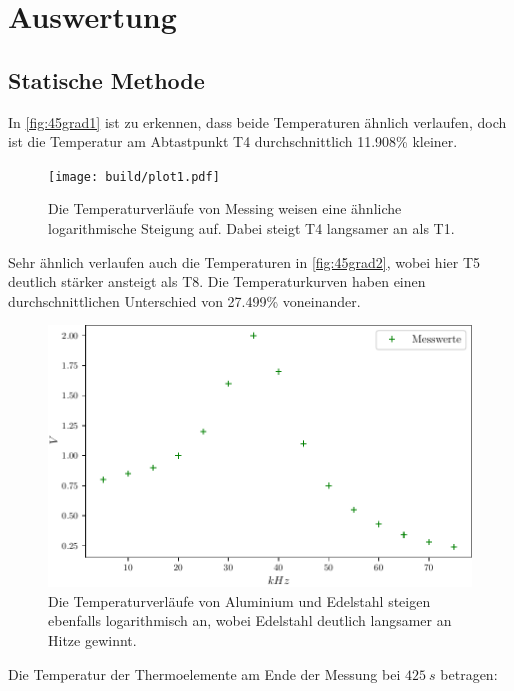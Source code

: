 \section{Auswertung}
\label{sec:Auswertung}

\subsection{Statische Methode}

In \autoref{fig:45grad1} ist zu erkennen, dass beide Temperaturen ähnlich verlaufen, doch ist die Temperatur am Abtastpunkt T4 durchschnittlich 11.908\% kleiner.

\begin{figure}
    \centering
    \texttt{[image: build/plot1.pdf]}
    \caption{Die Temperaturverläufe von Messing  weisen eine ähnliche logarithmische Steigung auf. Dabei steigt T4 langsamer an als T1.}
    \label{fig:45grad1}
\end{figure}

Sehr ähnlich verlaufen auch die Temperaturen in \autoref{fig:45grad2}, wobei hier T5 deutlich stärker ansteigt als T8.
Die Temperaturkurven haben einen durchschnittlichen Unterschied von 27.499\% voneinander.

\begin{figure}
    \centering
    \includegraphics[scale=0.7]{build/plot2.pdf}
    \caption{Die Temperaturverläufe von Aluminium und Edelstahl steigen ebenfalls logarithmisch an, wobei Edelstahl deutlich langsamer an Hitze gewinnt.}
    \label{fig:45grad2}
\end{figure}

Die Temperatur der Thermoelemente am Ende der Messung bei $425\ s$ betragen:

